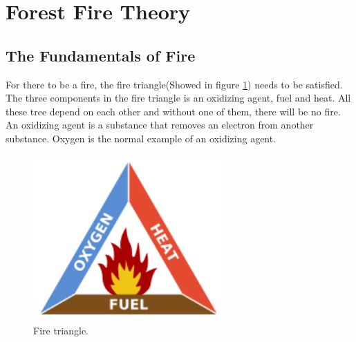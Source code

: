 \section{Forest Fire Theory}
\subsection{The Fundamentals of Fire}
For there to be a fire, the fire triangle(Showed in figure \ref{fig:fire-triangle}) needs to be satisfied. The three components in the fire triangle is an oxidizing agent, fuel and heat. All these tree depend on each other and without one of them, there will be no fire. An oxidizing agent is a substance that removes an electron from another substance. Oxygen is the normal example of an oxidizing agent.
\begin{figure}[here]
  \centering
      \includegraphics[width=0.65\textwidth]{theory/graphics/fire-triangle.png}
  \caption{ Fire triangle. }
  \label{fig:fire-triangle}
\end{figure}
